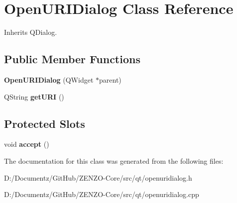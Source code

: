 \hypertarget{class_open_u_r_i_dialog}{}\section{Open\+U\+R\+I\+Dialog Class Reference}
\label{class_open_u_r_i_dialog}


Inherits Q\+Dialog.

\subsection*{Public Member Functions}
\begin{DoxyCompactItemize}
\item 
\mbox{\label{class_open_u_r_i_dialog_aa8b99129a4e66c994474c4a5056cd172}} 
{\bfseries Open\+U\+R\+I\+Dialog} (Q\+Widget $\ast$parent)
\item 
\mbox{\label{class_open_u_r_i_dialog_a38f9f110ae47996eff920171aea9400b}} 
Q\+String {\bfseries get\+U\+RI} ()
\end{DoxyCompactItemize}
\subsection*{Protected Slots}
\begin{DoxyCompactItemize}
\item 
\mbox{\label{class_open_u_r_i_dialog_a3c0c5b376623e9570cc17e23778c239c}} 
void {\bfseries accept} ()
\end{DoxyCompactItemize}


The documentation for this class was generated from the following files\+:\begin{DoxyCompactItemize}
\item 
D\+:/\+Documentz/\+Git\+Hub/\+Z\+E\+N\+Z\+O-\/\+Core/src/qt/openuridialog.\+h\item 
D\+:/\+Documentz/\+Git\+Hub/\+Z\+E\+N\+Z\+O-\/\+Core/src/qt/openuridialog.\+cpp\end{DoxyCompactItemize}
